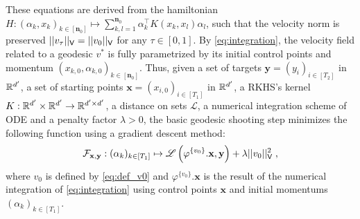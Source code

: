   These equations are derived from the hamiltonian $H:(\alpha_k,x_k)_{k\in [\mathbf{n}_0]}\mapsto \sum_{k,l=1}^{\mathbf{n}_0} \alpha_{k}^\top K(x_k,x_l)\alpha_{l}  $, such that
  the velocity norm is preserved $||v_\tau||_{\mathsf{V}}=||v_0||_{\mathsf{V}} $ for any $\tau\in [0,1]$.
   By \eqref{eq:integration}, the velocity field related to a geodesic $v^*$ is fully parametrized by its initial control points and momentum $(x_{k,0},\alpha_{k,0})_{k\in[\mathbf{n}_0]}$.
   Thus, given a set of targets $\mathbf{y}=(y_i)_{i\in[T_2]}$ in $\mathbb{R}^{d'}$, a set of starting points $\mathbf{x}=(x_{i,0})_{i\in[T_1]}$ in $\mathbb{R}^{d'}$, a RKHS's kernel $K:\mathbb{R}^{d'}\times \mathbb{R}^{d'}\to \mathbb{R}^{d'\times d'}$, a distance on sets $\mathscr{L}$, 
 a numerical integration scheme of ODE and a penalty factor $\lambda>0$, the basic geodesic shooting step minimizes the following function using a gradient descent method:
   \begin{equation}
    \label{eq:relaxation}
    \mathcal{F}_{\mathbf{x},\mathbf{y}}: (\alpha_k)_{k\in [T_1]}\mapsto \mathscr{L}\left(\varphi^{\{v_0\}}.\mathbf{x},\mathbf{y}\right)+\lambda||v_0||_{\mathsf{V}}^2 \;,  
   \end{equation}
   where $v_0$ is defined by \eqref{eq:def_v0} and $\varphi^{\{v_0\}}.\mathbf{x}$ is the result of the numerical integration of \eqref{eq:integration} using control points $\mathbf{x}$ and initial momentums $(\alpha_k)_{k\in[T_1]} $. 

